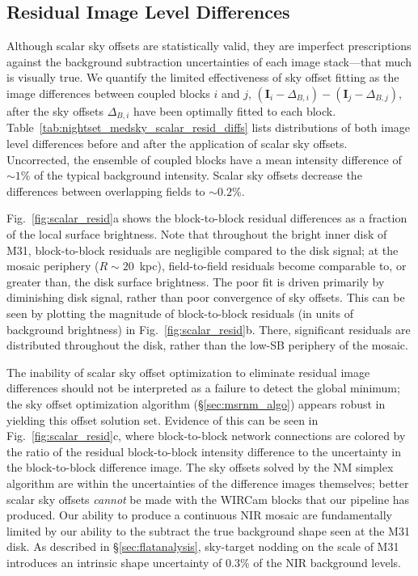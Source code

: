 \documentclass[iop,tighten]{emulateapj}
\newcommand{\vect}[1]{\boldsymbol{#1}} %
\newcommand{\Fig}[1]{Fig.~\ref{fig:#1}}  %
\newcommand{\Tab}[1]{Table~\ref{tab:#1}}  %
\newcommand{\Sec}[1]{\S\ref{sec:#1}}  %
\begin{document}
\subsection{Residual Image Level Differences}
\label{sec:residual_diffs}

Although scalar sky offsets are statistically valid, they are imperfect prescriptions against the background subtraction uncertainties of each image stack---that much is visually true.
We quantify the limited effectiveness of sky offset fitting as the image differences between coupled blocks $i$ and $j$, $(\vect{I}_i - \Delta_{B,i}) - (\vect{I}_j - \Delta_{B,j})$, after the sky offsets $\Delta_{B,i}$ have been optimally fitted to each block. 
\Tab{nightset_medsky_scalar_resid_diffs} lists distributions of both image level differences before and after the application of scalar sky offsets.
Uncorrected, the ensemble of coupled blocks have a mean intensity difference of $\sim 1\%$ of the typical background intensity.
Scalar sky offsets decrease the differences between overlapping fields to $\sim 0.2\%$.

\Fig{scalar_resid}a shows the block-to-block residual differences as a fraction of the local surface brightness.
Note that throughout the bright inner disk of M31, block-to-block residuals are negligible compared to the disk signal; at the mosaic periphery ($R\sim 20$~kpc), field-to-field residuals become comparable to, or greater than, the disk surface brightness.
The poor fit is driven primarily by diminishing disk signal, rather than poor convergence of sky offsets.
This can be seen by plotting the magnitude of block-to-block residuals (in units of background brightness) in \Fig{scalar_resid}b.
There, significant residuals are distributed throughout the disk, rather than the low-SB periphery of the mosaic.

The inability of scalar sky offset optimization to eliminate residual image differences should not be interpreted as a failure to detect the global minimum; the sky offset optimization algorithm (\Sec{msrnm_algo}) appears robust in yielding this offset solution set.
Evidence of this can be seen in \Fig{scalar_resid}c, where block-to-block network connections are colored by the ratio of the residual block-to-block intensity difference to the uncertainty in the block-to-block difference image.
The sky offsets solved by the NM simplex algorithm are within the uncertainties of the difference images themselves; better scalar sky offsets \emph{cannot} be made with the WIRCam blocks that our pipeline has produced.
Our ability to produce a continuous NIR mosaic are fundamentally limited by our ability to the subtract the true background shape seen at the M31 disk.
As described in \Sec{flatanalysis}, sky-target nodding on the scale of M31 introduces an intrinsic shape uncertainty of 0.3\% of the NIR background levels.
\end{document}
